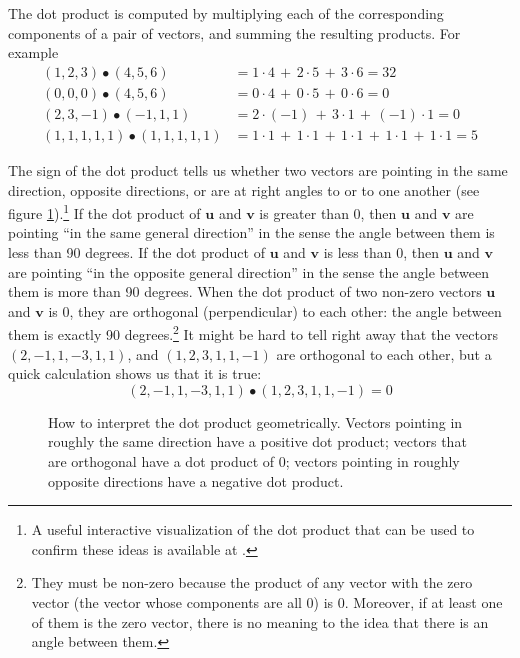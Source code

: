    The dot product is computed by multiplying each of the corresponding 
components of a pair of vectors, and summing the resulting products. For 
example
\begin{align*}
(1,2,3)  \bullet  (4,5,6) &= 1 \cdot 4 \,+\, 2 \cdot 5 \,+\, 3 \cdot 6
= 32 \\
(0,0,0)  \bullet  (4,5,6) &= 0 \cdot 4 \,+\, 0 \cdot 5 \,+\, 0 \cdot 6
= 0  \\
(2,3,-1) \bullet (-1,1,1) &= 2 \cdot (-1) \,+\, 3 \cdot 1 \,+\, (-1)
\cdot 1 = 0 \\
(1,1,1,1,1) \bullet (1,1,1,1,1) &=
 1 \cdot 1 \,+\, 1 \cdot 1 \,+\,  1 \cdot 1 \,+\, 1 \cdot 1 \,+\, 1 \cdot 1 = 5
\end{align*}


The sign of the dot product tells us whether two vectors are pointing in the same direction, opposite directions, or are at right angles to or  to one another (see figure \ref{dotProductDirections}).\footnote{A useful interactive visualization of the dot product that can be used to confirm these ideas is available at .} If the dot product of $\textbf{u}$ and $\textbf{v}$ is greater than 0, then $\textbf{u}$ and $\textbf{v}$ are pointing ``in the same general direction'' in the sense the angle between them is less than 90 degrees.  If the dot product of $\textbf{u}$ and $\textbf{v}$ is less than 0, then $\textbf{u}$ and $\textbf{v}$ are pointing ``in the opposite general direction'' in the sense the angle between them is more than 90 degrees. When the dot product of two non-zero vectors $\textbf{u}$ and $\textbf{v}$ is 0, they are orthogonal (perpendicular) to each other: the angle between them is exactly 90 degrees.\footnote{They must be non-zero because the product of any vector with the zero vector (the vector whose components are all $0$) is $0$. Moreover, if at least one of them is the zero vector, there is no meaning to the idea that there is an angle between them.} It might be hard to tell right away that the vectors $(2,-1,1,-3,1,1)$, and $(1,2,3,1,1,-1)$ are orthogonal to each other, but a quick calculation
shows us that it is true:
\[
  (2,-1,1,-3,1,1) \bullet (1,2,3,1,1,-1) = 0
\]

\begin{figure}[h]
\centering
{}
\caption[Scott Hotton.]{How to interpret the dot product geometrically. Vectors pointing in roughly the same direction have a positive dot product; vectors that are orthogonal have a dot product of 0;  vectors pointing in roughly opposite directions have a negative dot product.}
\label{dotProductDirections}
\end{figure}

